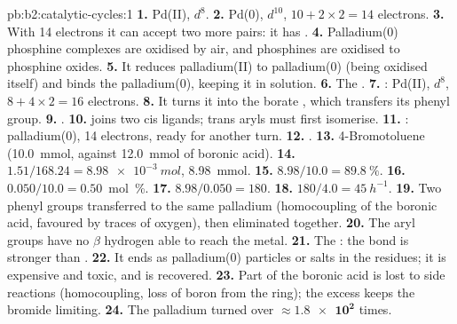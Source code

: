 \begin{solution}{pb:b2:catalytic-cycles:1}
\textbf{1.} Pd(II), $d^8$.
\textbf{2.} Pd(0), $d^{10}$, $10 + 2 \times 2 = 14$ electrons.
\textbf{3.} With 14 electrons it can accept two more pairs: it has .
\textbf{4.} Palladium(0) phosphine complexes are oxidised by air, and phosphines are
oxidised to phosphine oxides.
\textbf{5.} It reduces palladium(II) to palladium(0) (being oxidised itself) and binds the
palladium(0), keeping it in solution.
\textbf{6.} The .
\textbf{7.} : Pd(II), $d^8$, $8 + 4 \times 2 =
16$ electrons.
\textbf{8.} It turns it into the borate , which transfers its phenyl group.
\textbf{9.} .
\textbf{10.}  joins two cis ligands; trans aryls must first isomerise.
\textbf{11.} : palladium(0), 14 electrons, ready
for another turn.
\textbf{12.} .
\textbf{13.} 4-Bromotoluene (\qty{10.0}{mmol}, against \qty{12.0}{mmol} of boronic acid).
\textbf{14.} $1.51/168.24 = \qty{8.98e-3}{mol}$, \qty{8.98}{mmol}.
\textbf{15.} $8.98/10.0 = 89.8~\%$.
\textbf{16.} $0.050/10.0 = 0.50$~mol~\%.
\textbf{17.} $8.98/0.050 = 180$.
\textbf{18.} $180/4.0 = \qty{45}{h^{-1}}$.
\textbf{19.} Two phenyl groups transferred to the same palladium (homocoupling of the
boronic acid, favoured by traces of oxygen), then eliminated together.
\textbf{20.} The aryl groups have no $\beta$ hydrogen able to reach the metal.
\textbf{21.} The : the  bond is stronger than .
\textbf{22.} It ends as palladium(0) particles or salts in the residues; it is expensive and
toxic, and is recovered.
\textbf{23.} Part of the boronic acid is lost to side reactions (homocoupling, loss of boron
from the ring); the excess keeps the bromide limiting.
\textbf{24.} The palladium turned over $\boldsymbol{\approx \num{1.8e2}}$ times.
\end{solution}
